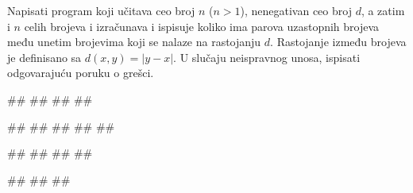 \begin{Exercise}[label=PET_26] 
Napisati program koji učitava ceo broj $n$ ($n>1$), nenegativan ceo broj $d$, a zatim i
$n$ celih brojeva i izračunava i ispisuje koliko ima parova
uzastopnih brojeva među unetim brojevima koji se nalaze na rastojanju
$d$. Rastojanje između brojeva je definisano sa $d(x,y)=|y-x|$.
U slučaju neispravnog unosa, ispisati odgovarajuću poruku o grešci.

\begin{miditest}
\begin{upotreba}{1}
#\naslovInt#
##
##
##
\end{upotreba}
\end{miditest}
\begin{miditest}
\begin{upotreba}{2}
#\naslovInt#
##
##
##
##
\end{upotreba}
\end{miditest}

\begin{miditest}
\begin{upotreba}{3}
#\naslovInt#
##
##
##
\end{upotreba}
\end{miditest}
\begin{miditest}
\begin{upotreba}{4}
#\naslovInt#
##
##
\end{upotreba}
\end{miditest}

\end{Exercise}
\ifresenja
\begin{Answer}[ref=PET_26]
\end{Answer}
\fi


